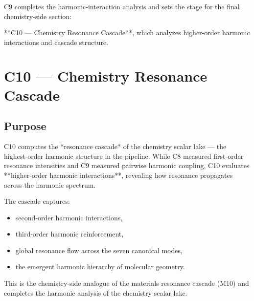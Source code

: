 \documentclass[11pt, letterpaper, openany]{book}
\begin{document}
C9 completes the harmonic‑interaction analysis and sets the stage for the final
chemistry‑side section:

**C10 — Chemistry Resonance Cascade**, which analyzes higher‑order harmonic
interactions and cascade structure.


\section{C10 — Chemistry Resonance Cascade}

\subsection*{Purpose}
C10 computes the *resonance cascade* of the chemistry scalar lake — the highest‑order harmonic structure in the pipeline. While C8 measured first‑order resonance intensities and C9 measured pairwise harmonic coupling, C10 evaluates **higher‑order harmonic interactions**, revealing how resonance propagates across the harmonic spectrum.

The cascade captures:

\begin{itemize}
    \item second‑order harmonic interactions,
    \item third‑order harmonic reinforcement,
    \item global resonance flow across the seven canonical modes,
    \item the emergent harmonic hierarchy of molecular geometry.
\end{itemize}

This is the chemistry‑side analogue of the materials resonance cascade (M10) and completes the harmonic analysis of the chemistry scalar lake.
\end{document}
